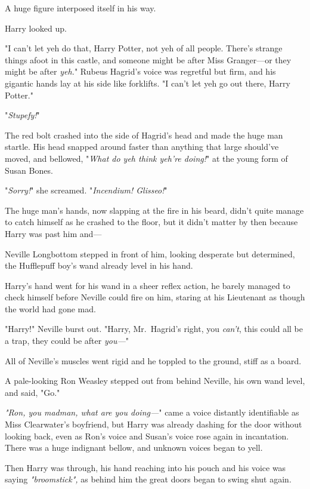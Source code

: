 A huge figure interposed itself in his way.

Harry looked up.

"I can't let yeh do that, Harry Potter, not yeh of all people. There's strange 
things afoot in this castle, and someone might be after Miss Granger---or they 
might be after \emph{yeh.}" Rubeus Hagrid's voice was regretful but firm, and 
his gigantic hands lay at his side like forklifts. "I can't let yeh go out 
there, Harry Potter."

"\emph{Stupefy!}"

The red bolt crashed into the side of Hagrid's head and made the huge man 
startle. His head snapped around faster than anything that large should've 
moved, and bellowed, "\emph{What do yeh think yeh're doing!}" at the young form 
of Susan Bones.

"\emph{Sorry!}" she screamed. "\emph{Incendium! Glisseo!}"

The huge man's hands, now slapping at the fire in his beard, didn't quite 
manage to catch himself as he crashed to the floor, but it didn't matter by 
then because Harry was past him and---

Neville Longbottom stepped in front of him, looking desperate but determined, 
the Hufflepuff boy's wand already level in his hand.

Harry's hand went for his wand in a sheer reflex action, he barely managed to 
check himself before Neville could fire on him, staring at his Lieutenant as 
though the world had gone mad.

"Harry!" Neville burst out. "Harry, Mr.~Hagrid's right, you \emph{can't}, this 
could all be a trap, they could be after \emph{you---}"

All of Neville's muscles went rigid and he toppled to the ground, stiff as a 
board.

A pale-looking Ron Weasley stepped out from behind Neville, his own wand level, 
and said, "Go."

\emph{"Ron, you madman, what are you doing---}" came a voice distantly 
identifiable as Miss Clearwater's boyfriend, but Harry was already dashing for 
the door without looking back, even as Ron's voice and Susan's voice rose again 
in incantation. There was a huge indignant bellow, and unknown voices began to 
yell.

Then Harry was through, his hand reaching into his pouch and his voice was 
saying \emph{"broomstick",} as behind him the great doors began to swing shut 
again.


